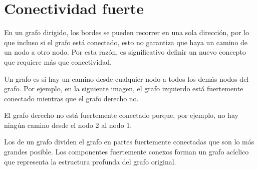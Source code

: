 \chapter{Conectividad fuerte}


En un grafo dirigido,
los bordes se pueden recorrer en una sola dirección,
por lo que incluso si el grafo está conectado,
esto no garantiza que haya
un camino de un nodo a otro nodo.
Por esta razón, es significativo definir un nuevo concepto
que requiere más que conectividad.

Un grafo es 
si hay un camino desde cualquier nodo a todos
los demás nodos del grafo.
Por ejemplo, en la siguiente imagen,
el grafo izquierdo está fuertemente conectado
mientras que el grafo derecho no.

\begin{center}
\end{center}

El grafo derecho no está fuertemente conectado
porque, por ejemplo, no hay ningún camino
desde el nodo 2 al nodo 1.


Los 
de un grafo dividen el grafo en partes fuertemente conectadas
que son lo más grandes posible.
Los componentes fuertemente conexos forman un
grafo  acíclico que representa
la estructura profunda del grafo original.

